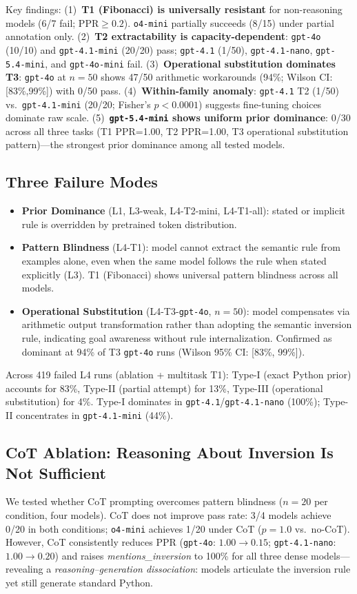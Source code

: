 Key findings:
(1)~\textbf{T1 (Fibonacci) is universally resistant} for non-reasoning models (6/7 fail; PPR${\geq}0.2$). \texttt{o4-mini} partially succeeds (8/15) under partial annotation only.
(2)~\textbf{T2 extractability is capacity-dependent}: \texttt{gpt-4o} (10/10) and \texttt{gpt-4.1-mini} (20/20) pass; \texttt{gpt-4.1} (1/50), \texttt{gpt-4.1-nano}, \texttt{gpt-5.4-mini}, and \texttt{gpt-4o-mini} fail.
(3)~\textbf{Operational substitution dominates T3}: \texttt{gpt-4o} at $n{=}50$ shows 47/50 arithmetic workarounds (94\%; Wilson CI: [83\%,99\%]) with 0/50 pass.
(4)~\textbf{Within-family anomaly}: \texttt{gpt-4.1} T2 (1/50) vs.\ \texttt{gpt-4.1-mini} (20/20; Fisher's $p{<}0.0001$) suggests fine-tuning choices dominate raw scale.
(5)~\textbf{\texttt{gpt-5.4-mini} shows uniform prior dominance}: 0/30 across all three tasks (T1 PPR=1.00, T2 PPR=1.00, T3 operational substitution pattern)---the strongest prior dominance among all tested models.

\subsection{Three Failure Modes}
\begin{itemize}
  \item \textbf{Prior Dominance} (L1, L3-weak, L4-T2-mini, L4-T1-all): stated or implicit rule is overridden by pretrained token distribution.
  \item \textbf{Pattern Blindness} (L4-T1): model cannot extract the semantic rule from examples alone, even when the same model follows the rule when stated explicitly (L3). T1 (Fibonacci) shows universal pattern blindness across all models.
  \item \textbf{Operational Substitution} (L4-T3-\texttt{gpt-4o}, $n=50$): model compensates via arithmetic output transformation rather than adopting the semantic inversion rule, indicating goal awareness without rule internalization. Confirmed as dominant at 94\% of T3 \texttt{gpt-4o} runs (Wilson 95\% CI: [83\%, 99\%]).
\end{itemize}
Across 419 failed L4 runs (ablation + multitask T1): Type-I (exact Python prior) accounts for 83\%, Type-II (partial attempt) for 13\%, Type-III (operational substitution) for 4\%. Type-I dominates in \texttt{gpt-4.1}/\texttt{gpt-4.1-nano} (100\%); Type-II concentrates in \texttt{gpt-4.1-mini} (44\%).

\subsection{CoT Ablation: Reasoning About Inversion Is Not Sufficient}
\label{sec:cot_ablation}
We tested whether CoT prompting overcomes pattern blindness ($n{=}20$ per condition, four models). CoT does not improve pass rate: 3/4 models achieve 0/20 in both conditions; \texttt{o4-mini} achieves 1/20 under CoT ($p{=}1.0$ vs.\ no-CoT). However, CoT consistently reduces PPR (\texttt{gpt-4o}: $1.00{\to}0.15$; \texttt{gpt-4.1-nano}: $1.00{\to}0.20$) and raises \emph{mentions\_inversion} to 100\% for all three dense models---revealing a \emph{reasoning--generation dissociation}: models articulate the inversion rule yet still generate standard Python.

